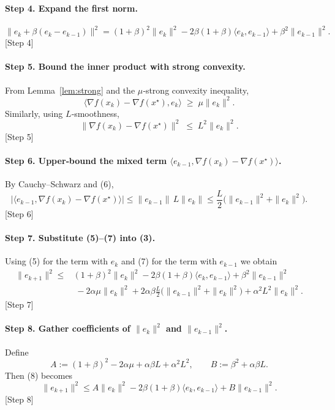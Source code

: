 \documentclass{article}
\begin{document}
\paragraph{Step 4. Expand the first norm.}
\[
\|e_{k}+\beta(e_{k}-e_{k-1})\|^{2}
 = (1+\beta)^{2}\|e_{k}\|^{2}
   -2\beta(1+\beta)\langle e_{k},e_{k-1}\rangle
   +\beta^{2}\|e_{k-1}\|^{2}. \tag{4}
\]
[Step 4]

\paragraph{Step 5. Bound the inner product with strong convexity.}
From Lemma~\ref{lem:strong} and the $\mu$‑strong convexity inequality,
\[
\langle \nabla f(x_{k})-\nabla f(x^{\star}),e_{k}\rangle
\;\ge\;\mu\|e_{k}\|^{2}. \tag{5}
\]
Similarly, using $L$‑smoothness,
\[
\|\nabla f(x_{k})-\nabla f(x^{\star})\|^{2}
\;\le\;L^{2}\|e_{k}\|^{2}. \tag{6}
\]
[Step 5]

\paragraph{Step 6. Upper‑bound the mixed term $\langle e_{k-1},\nabla f(x_{k})-\nabla f(x^{\star})\rangle$.}
By Cauchy–Schwarz and (6),
\[
|\langle e_{k-1},\nabla f(x_{k})-\nabla f(x^{\star})\rangle|
\le \|e_{k-1}\|\,L\|e_{k}\|
\le \frac{L}{2}\bigl(\|e_{k-1}\|^{2}+\|e_{k}\|^{2}\bigr). \tag{7}
\]
[Step 6]

\paragraph{Step 7. Substitute (5)–(7) into (3).}
Using (5) for the term with $e_{k}$ and (7) for the term with $e_{k-1}$ we obtain
\[
\begin{aligned}
\|e_{k+1}\|^{2}
\le& (1+\beta)^{2}\|e_{k}\|^{2}
     -2\beta(1+\beta)\langle e_{k},e_{k-1}\rangle
     +\beta^{2}\|e_{k-1}\|^{2} \\
 &\; -2\alpha\mu\|e_{k}\|^{2}
   +2\alpha\beta\frac{L}{2}\bigl(\|e_{k-1}\|^{2}+\|e_{k}\|^{2}\bigr)
   +\alpha^{2}L^{2}\|e_{k}\|^{2}.
\end{aligned}
\tag{8}
\]
[Step 7]

\paragraph{Step 8. Gather coefficients of $\|e_{k}\|^{2}$ and $\|e_{k-1}\|^{2}$.}
Define
\[
A:= (1+\beta)^{2}-2\alpha\mu+\alpha\beta L+\alpha^{2}L^{2},
\qquad
B:= \beta^{2}+ \alpha\beta L .
\]
Then (8) becomes
\[
\|e_{k+1}\|^{2}\le A\|e_{k}\|^{2}-2\beta(1+\beta)\langle e_{k},e_{k-1}\rangle +B\|e_{k-1}\|^{2}. \tag{9}
\]
[Step 8]
\end{document}
